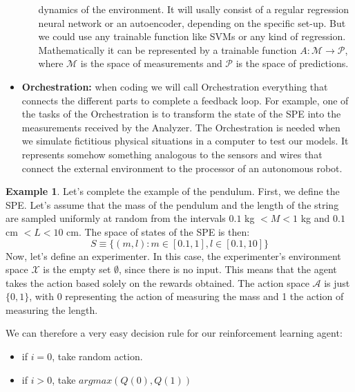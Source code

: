 \documentclass[11pt,a4paper,twoside]{report}
\newcommand{\+}{\textnormal{+} }
\theoremstyle{definition}
\newtheorem{myex}[mythm]{Example}
\numberwithin{equation}{chapter}
\begin{document}
\begin{itemize}
\begin{itemize}
        dynamics of the environment. It will usally consist of a regular 
        regression neural network or an autoencoder, depending on the 
        specific set-up. But we could use any trainable function like SVMs or
        any kind of regression. Mathematically it can be represented by a 
        trainable function $ A :\mathcal{M} \rightarrow \mathcal{P}$, where $\mathcal{M}$ is the space
        of measurements and $\mathcal{P}$ is the space of predictions.
  \end{itemize}
    \item \textbf{Orchestration:} when coding we will call Orchestration
    everything that connects the different parts to complete a feedback loop.
    For example, one of the tasks of the Orchestration is to transform the state
    of the SPE into the measurements received by the Analyzer. The Orchestration
    is needed when we simulate fictitious physical situations in a computer to
    test our models. It represents somehow something analogous to the sensors
    and wires that connect the external environment to the processor of an
    autonomous robot.
\end{itemize}

\begin{myex}
Let's complete the example of the pendulum. First, we define the SPE. Let's
assume that the mass of the pendulum and the length of the string are sampled
uniformly at random from the intervals $0.1$ kg $< M < 1$ kg and \break $ 0.1$ cm $<L<10
$ cm. The space of states of the SPE is then:
 \begin{equation}
  S\equiv \{(m,l):m \in \left[0.1, 1\right],l \in [0.1,10]\}
 \end{equation}
Now, let's define an experimenter. In this case, the experimenter's environment
space $\mathcal{X}$
is the empty set $\emptyset$, since there is no input. This means that the agent
takes the action based solely on the rewards obtained. The action space 
$\mathcal{A}$ is just $\{0,1\}$, with 0 representing the action of measuring the
mass and 1 the action of measuring the length.

We can therefore a very easy decision rule for our reinforcement learning agent:

\begin{itemize}
  \item if $i=0$, take random action.
  \item if $i>0$, take $argmax(Q(0), Q(1))$ 
\end{itemize}



\end{myex}
\end{document}
